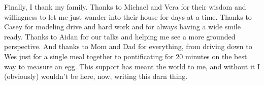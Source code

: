 Finally, I thank my family. Thanks to Michael and Vera for their wisdom and willingness to let me just wander into their house for days at a time. Thanks to Casey for modeling drive and hard work and for always having a wide smile ready. Thanks to Aidan for our talks and helping me see a more grounded perspective. And thanks to Mom and Dad for everything, from driving down to Wes just for a single meal together to pontificating for 20 minutes on the best way to measure an egg. This support has meant the world to me, and without it I (obviously) wouldn't be here, now, writing this darn thing.








